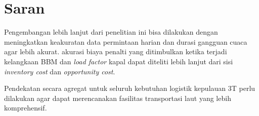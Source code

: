 \section{Saran}
\label{chap:saran}
Pengembangan lebih lanjut dari penelitian ini bisa dilakukan dengan meningkatkan keakuratan data permintaan harian dan durasi gangguan cuaca agar lebih akurat. akurasi biaya penalti yang ditimbulkan ketika terjadi kelangkaan BBM dan \emph{load factor} kapal dapat diteliti lebih lanjut dari sisi \emph{inventory cost} dan \emph{opportunity cost}.

Pendekatan secara agregat untuk seluruh kebutuhan logistik kepulauan 3T perlu dilakukan agar dapat merencanakan fasilitas transportasi laut yang lebih komprehensif.


